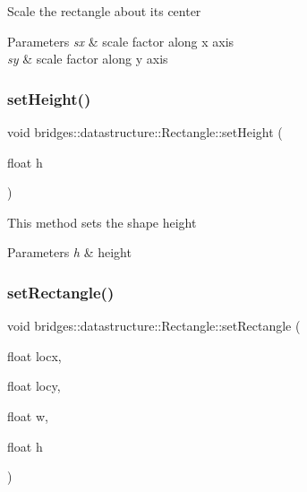 Scale the rectangle about its center


\begin{DoxyParams}{Parameters}
{\em sx} & scale factor along x axis \\
\hline
{\em sy} & scale factor along y axis \\
\hline
\end{DoxyParams}
\mbox{\label{classbridges_1_1datastructure_1_1_rectangle_a6a3e99759282dd822c5615d1643f2a81}} 
\subsubsection{\texorpdfstring{setHeight()}{setHeight()}}
{\footnotesize\ttfamily void bridges\+::datastructure\+::\+Rectangle\+::set\+Height (\begin{DoxyParamCaption}\item[{float}]{h }\end{DoxyParamCaption})\hspace{0.3cm}{\ttfamily [inline]}}

This method sets the shape height


\begin{DoxyParams}{Parameters}
{\em h} & height \\
\hline
\end{DoxyParams}
\mbox{\label{classbridges_1_1datastructure_1_1_rectangle_a01e49a75f3826ea63e581d3669e3626b}} 
\subsubsection{\texorpdfstring{setRectangle()}{setRectangle()}}
{\footnotesize\ttfamily void bridges\+::datastructure\+::\+Rectangle\+::set\+Rectangle (\begin{DoxyParamCaption}\item[{float}]{locx,  }\item[{float}]{locy,  }\item[{float}]{w,  }\item[{float}]{h }\end{DoxyParamCaption})\hspace{0.3cm}{\ttfamily [inline]}}

